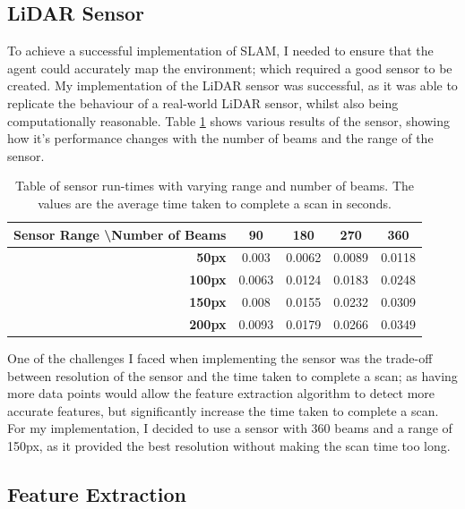 \documentclass[12pt]{article}
\begin{document}
\subsection{LiDAR Sensor}
To achieve a successful implementation of SLAM, I needed to ensure that the agent could accurately map the environment; which
required a good sensor to be created. My implementation of the LiDAR sensor was successful, as it was able to replicate the
behaviour of a real-world LiDAR sensor, whilst also being computationally reasonable. Table \ref{results_tab} shows various
results of the sensor, showing how it's performance changes with the number of beams and the range of the sensor. \\
\begin{table}[H]
    \centering
    \begin{tabular}{|r|c|c|c|c|}
        \hline
        \textbf{Sensor Range \textbackslash Number of Beams} &
        \textbf{90}&
        \textbf{180} &
        \textbf{270} &
        \textbf{360} \\
        \hline
        \textbf{50px} &
        0.003 &
        0.0062 &
        0.0089 &
        0.0118 \\
        \hline
        \textbf{100px} &
        0.0063 &
        0.0124 &
        0.0183 &
        0.0248 \\
        \hline
        \textbf{150px} &
        0.008 &
        0.0155 &
        0.0232 &
        0.0309 \\
        \hline
        \textbf{200px} &
        0.0093 &
        0.0179 &
        0.0266 &
        0.0349 \\
        \hline
    \end{tabular}
    \caption{Table of sensor run-times with varying range and number of beams. The values are the average time taken
    to complete a scan in seconds.}
    \label{results_tab}
\end{table}
One of the challenges I faced when implementing the sensor was the trade-off between resolution of the sensor and the
time taken to complete a scan; as having more data points would allow the feature extraction algorithm to detect more
accurate features, but significantly increase the time taken to complete a scan. For my implementation, I decided to use
a sensor with 360 beams and a range of 150px, as it provided the best resolution without making the scan time too long.\\

\subsection{Feature Extraction}
\end{document}
